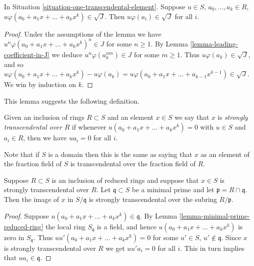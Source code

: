 \begin{lemma}
\label{lemma-all-coefficients-in-J}
In Situation \ref{situation-one-transcendental-element}.
Suppose $u \in S$, $a_0, \ldots, a_k \in R$,
$u \varphi(a_0 + a_1x + \ldots + a_k x^k) \in \sqrt{J}$.
Then $u \varphi(a_i) \in \sqrt{J}$ for all $i$.
\end{lemma}

\begin{proof}
Under the assumptions of the lemma we have
$u^n \varphi(a_0 + a_1x + \ldots + a_k x^k)^n \in J$ for
some $n \geq 1$. By Lemma \ref{lemma-leading-coefficient-in-J}
we deduce $u^n \varphi(a_k^{nm}) \in J$ for some $m \geq 1$.
Thus $u \varphi(a_k) \in \sqrt{J}$, and so
$u \varphi(a_0 + a_1x + \ldots + a_k x^k) - u \varphi(a_k) =
u \varphi(a_0 + a_1x + \ldots + a_{k-1} x^{k-1}) \in \sqrt{J}$.
We win by induction on $k$.
\end{proof}

\noindent
This lemma suggests the following definition.

\begin{definition}
\label{definition-strongly-transcendental}
Given an inclusion of rings $R \subset S$ and
an element $x \in S$ we say that $x$ is
{\it strongly transcendental over $R$} if
whenever $u(a_0 + a_1 x + \ldots + a_k x^k) = 0$
with $u \in S$ and $a_i \in R$, then
we have $ua_i = 0$ for all $i$.
\end{definition}

\noindent
Note that if $S$ is a domain then this is the same as
saying that $x$ as an element of the fraction field of
$S$ is transcendental over the fraction field of $R$.

\begin{lemma}
\label{lemma-reduced-strongly-transcendental-minimal-prime}
Suppose $R \subset S$ is an inclusion of reduced rings
and suppose that $x \in S$ is strongly transcendental over $R$.
Let $\mathfrak q \subset S$ be a minimal prime
and let $\mathfrak p = R \cap \mathfrak q$.
Then the image of $x$ in $S/\mathfrak q$ is strongly
transcendental over the subring $R/\mathfrak p$.
\end{lemma}

\begin{proof}
Suppose $u(a_0 + a_1x + \ldots + a_k x^k) \in \mathfrak q$.
By Lemma \ref{lemma-minimal-prime-reduced-ring}
the local ring $S_{\mathfrak q}$ is a field,
and hence $u(a_0 + a_1x + \ldots + a_k x^k) $ is zero
in $S_{\mathfrak q}$. Thus $uu'(a_0 + a_1x + \ldots + a_k x^k) = 0$
for some $u' \in S$, $u' \not\in \mathfrak q$.
Since $x$ is strongly transcendental over $R$ we get
$uu'a_i = 0$ for all $i$. This in turn implies
that $ua_i \in \mathfrak q$.
\end{proof}

